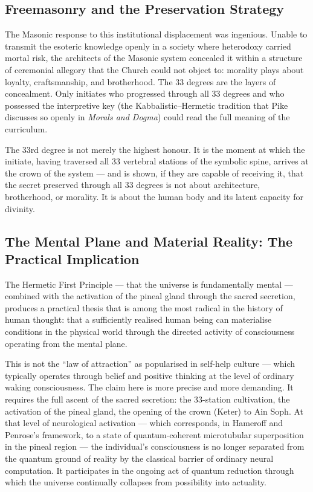 \documentclass[12pt, a4paper]{article}
\begin{document}
\subsection{Freemasonry and the Preservation Strategy}

The Masonic response to this institutional displacement was ingenious. Unable
to transmit the esoteric knowledge openly in a society where heterodoxy carried
mortal risk, the architects of the Masonic system concealed it within a
structure of ceremonial allegory that the Church could not object to: morality
plays about loyalty, craftsmanship, and brotherhood. The 33 degrees are the
layers of concealment. Only initiates who progressed through all 33 degrees
and who possessed the interpretive key (the Kabbalistic--Hermetic tradition
that Pike discusses so openly in \emph{Morals and Dogma}) could read the full
meaning of the curriculum.

The 33rd degree is not merely the highest honour. It is the moment at which the
initiate, having traversed all 33 vertebral stations of the symbolic spine,
arrives at the crown of the system — and is shown, if they are capable of
receiving it, that the secret preserved through all 33 degrees is not about
architecture, brotherhood, or morality. It is about the human body and its
latent capacity for divinity.

\subsection{The Mental Plane and Material Reality: The Practical Implication}

The Hermetic First Principle — that the universe is fundamentally mental —
combined with the activation of the pineal gland through the sacred secretion,
produces a practical thesis that is among the most radical in the history of
human thought: that a sufficiently realised human being can materialise
conditions in the physical world through the directed activity of consciousness
operating from the mental plane.

This is not the ``law of attraction'' as popularised in self-help culture —
which typically operates through belief and positive thinking at the level of
ordinary waking consciousness. The claim here is more precise and more
demanding. It requires the full ascent of the sacred secretion: the 33-station
cultivation, the activation of the pineal gland, the opening of the crown
(Keter) to Ain Soph. At that level of neurological activation — which
corresponds, in Hameroff and Penrose's framework, to a state of
quantum-coherent microtubular superposition in the pineal region — the
individual's consciousness is no longer separated from the quantum ground of
reality by the classical barrier of ordinary neural computation. It participates
in the ongoing act of quantum reduction through which the universe continually
collapses from possibility into actuality.
\end{document}
